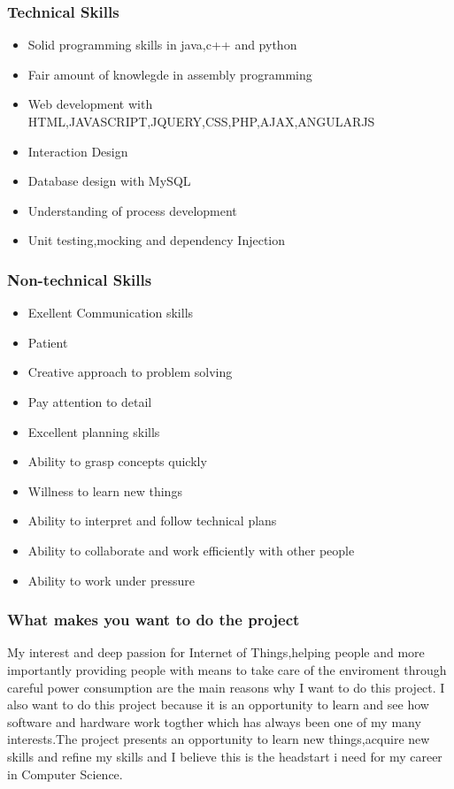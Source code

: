 \documentclass{scrartcl}
\begin{document}
\subsubsection{Technical Skills}
\begin{itemize}
\item Solid programming skills in java,c++ and python
\item Fair amount of knowlegde in assembly programming 
\item Web development with HTML,JAVASCRIPT,JQUERY,CSS,PHP,AJAX,ANGULARJS
\item Interaction Design 
\item Database design with MySQL
\item Understanding of process development
\item Unit testing,mocking and dependency Injection
\end{itemize}
\subsubsection{Non-technical Skills}
\begin{itemize}
\item Exellent Communication skills
\item Patient 
\item Creative approach to problem solving
\item Pay attention to detail 
\item Excellent planning skills
\item Ability to grasp concepts quickly
\item Willness to learn new things
\item Ability to interpret and follow technical plans
\item Ability to collaborate and work efficiently with other people
\item Ability to work under pressure
\end{itemize}
\subsubsection{What makes you want to do the project}
\begin{flushleft}
My interest and deep passion for Internet of Things,helping people and more importantly providing people with means to take
care of the enviroment through careful power consumption are the main reasons why I want to do this project. I also want to do
this project because it is an opportunity to learn and see how software and hardware work togther which has always been one of my many interests.The project presents an opportunity to learn new things,acquire new skills and refine my skills and I believe this is the headstart i need for my career in Computer Science. 
\end{flushleft}
\end{document}
